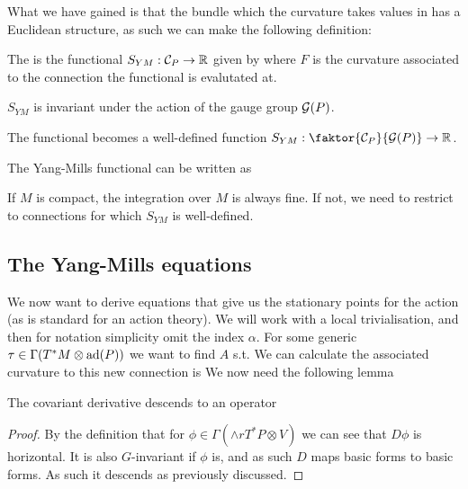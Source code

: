 \documentclass{article}
\begin{document}
What we have gained is that the bundle which the curvature takes values in has a Euclidean structure, as such we can make the following definition:

\begin{definition}
	The  is the functional $S_{YM}:\mathcal{C}_P \to \mathbb{R}$ given by 
where $F$ is the curvature associated to the connection the functional is evalutated at. 
\end{definition}

\begin{lemma}
	$S_{YM}$ is invariant under the action of the gauge group $\mathcal{G}(P)$. 
\end{lemma}

\begin{corollary}
	The functional becomes a well-defined function $S_{YM} : \faktor{\mc{C}_P}{\mc{G}(P)} \to \mbb{R}$. 
\end{corollary}

\begin{lemma}
	The Yang-Mills functional can be written as
\end{lemma}

\begin{remark}
	If $M$ is compact, the integration over $M$ is always fine. If not, we need to restrict to connections for which $S_{YM}$ is well-defined. 
\end{remark}

\subsection{The Yang-Mills equations}

We now want to derive equations that give us the stationary points for the action (as is standard for an action theory). We will work with a local trivialisation, and then for notation simplicity omit the index $\alpha$. For some generic $\tau \in \Gamma(T^\ast M \otimes \operatorname{ad}(P))$ we want to find $A$ s.t.  
We can calculate the associated curvature to this new connection is 
We now need the following lemma
\begin{lemma}
	The covariant derivative descends to an operator 
\end{lemma}
\begin{proof}
	By the definition that for $\phi \in \Gamma(\wedge r T^\ast P \otimes V)$ 
we can see that $D\phi$ is horizontal. It is also $G$-invariant if $\phi$ is, and as such $D$ maps basic forms to basic forms. As such it descends as previously discussed.
\end{proof}
\end{document}
